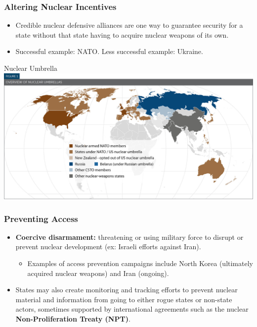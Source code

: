 \documentclass[handout]{beamer}
\begin{document}
\begin{frame} 
\frametitle{\LARGE{Altering Nuclear Incentives}}
\begin{itemize}
		\item Credible nuclear defensive alliances are one way to guarantee security for a state without that state having to acquire nuclear weapons of its own. \pause
		\item Successful example: NATO. Less successful example: Ukraine.
\end{itemize}
\end{frame}

\begin{frame}{\LARGE Nuclear Umbrella}
    \centering
\includegraphics[width=\textwidth,height=0.8\textheight,keepaspectratio]{nuclear umbrella.png}
\end{frame}

\begin{frame} 
	\frametitle{\LARGE{Preventing Access}}
	\begin{itemize}
		\item \textbf{Coercive disarmament:} threatening or using military force to disrupt or prevent nuclear development (ex: Israeli efforts against Iran). 
		\begin{itemize}
			\item Examples of access prevention campaigns include North Korea (ultimately acquired nuclear weapons) and Iran (ongoing). \pause
		\end{itemize}
		\item States may also create monitoring and tracking efforts to prevent nuclear material and information from going to either rogue states or non-state actors, sometimes supported by international agreements such as the nuclear \textbf{Non-Proliferation Treaty (NPT)}.
	\end{itemize}
\end{frame}
\end{document}
